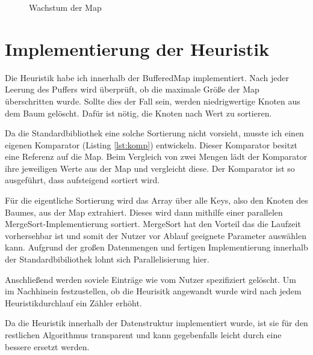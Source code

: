 \begin{figure}[!h]
	\centering
	
	\caption{Wachstum der Map}
	\label{abb:map}
\end{figure}

\section{Implementierung der Heuristik}
Die Heuristik habe ich innerhalb der BufferedMap implementiert. Nach jeder Leerung des Puffers wird überprüft, ob die maximale Größe der Map überschritten wurde.
Sollte dies der Fall sein, werden niedrigwertige Knoten aus dem Baum gelöscht. Dafür ist nötig, die Knoten nach Wert zu sortieren.

Da die Standardbibliothek eine solche Sortierung nicht vorsieht, musste ich einen eigenen Komparator (Listing \ref{lst:komp}) entwickeln. Dieser Komparator besitzt eine Referenz auf die Map. Beim Vergleich von zwei Mengen lädt der Komparator ihre jeweiligen Werte aus der Map und vergleicht diese. Der Komparator ist so ausgeführt, dass aufsteigend sortiert wird.

Für die eigentliche Sortierung wird das Array über alle Keys, also den Knoten des Baumes, aus der Map extrahiert. Dieses wird dann mithilfe einer parallelen MergeSort-Implementierung sortiert. MergeSort hat den Vorteil das die Laufzeit vorhersehbar ist und somit der Nutzer vor Ablauf geeignete Parameter auswählen kann. Aufgrund der großen Datenmengen und fertigen Implementierung innerhalb der Standardbibiliothek lohnt sich Parallelisierung hier.

Anschließend werden soviele Einträge wie vom Nutzer spezifiziert gelöscht. Um im Nachhinein festzustellen, ob die Heurisitk angewandt wurde wird nach jedem Heuristikdurchlauf ein Zähler erhöht.

Da die Heuristik innerhalb der Datenstruktur implementiert wurde, ist sie für den restlichen Algorithmus transparent und kann gegebenfalls leicht durch eine bessere ersetzt werden.